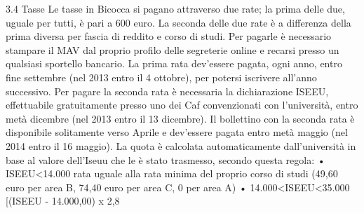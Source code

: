 3.4 Tasse
Le tasse in Bicocca si pagano attraverso due rate; la prima delle due, uguale per tutti, è pari a 600 euro. La seconda delle due rate è a differenza della prima diversa per fascia di reddito e corso di studi. 
Per pagarle è necessario stampare il MAV dal proprio profilo delle segreterie online e recarsi presso un qualsiasi sportello bancario. La prima rata dev'essere pagata, ogni anno, entro fine settembre (nel 2013 entro il 4 ottobre), per potersi iscrivere all'anno successivo. Per pagare la seconda rata è necessaria la dichiarazione ISEEU, effettuabile gratuitamente presso uno dei Caf convenzionati con l'università, entro metà dicembre (nel 2013 entro il 13 dicembre). 
Il bollettino con la seconda rata è disponibile solitamente verso Aprile e dev'essere pagata entro metà maggio (nel 2014 entro il 16 maggio). La quota è calcolata automaticamente dall'università in base al valore dell'Iseuu che le è stato trasmesso, secondo questa regola: 
       • ISEEU<14.000 rata uguale alla rata minima del proprio corso di studi (49,60 euro per area B, 74,40 euro per area C, 0 per area A) 
       • 14.000<ISEEU<35.000 [(ISEEU - 14.000,00) x 2,8%
